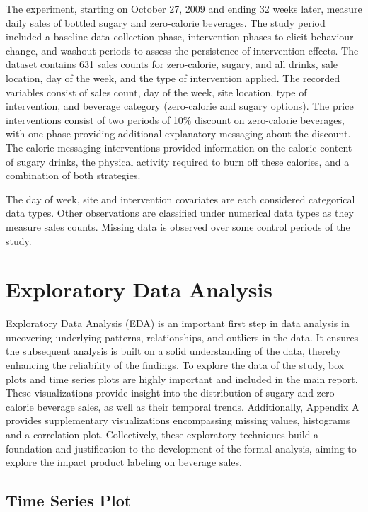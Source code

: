 \documentclass[
]{article}
\begin{document}
The experiment, starting on October 27, 2009 and ending 32 weeks later, measure daily sales of bottled sugary and zero-calorie beverages. The study period included a baseline data collection phase, intervention phases to elicit behaviour change, and washout periods to assess the persistence of intervention effects. The dataset contains 631 sales counts for zero-calorie, sugary, and all drinks, sale location, day of the week, and the type of intervention applied. The recorded variables consist of sales count, day of the week, site location, type of intervention, and beverage category (zero-calorie and sugary options). The price interventions consist of two periods of 10\% discount on zero-calorie beverages, with one phase providing additional explanatory messaging about the discount. The calorie messaging interventions provided information on the caloric content of sugary drinks, the physical activity required to burn off these calories, and a combination of both strategies.

The day of week, site and intervention covariates are each considered categorical data types. Other observations are classified under numerical data types as they measure sales counts. Missing data is observed over some control periods of the study.

\hypertarget{exploratory-data-analysis}{%
\section{Exploratory Data Analysis}\label{exploratory-data-analysis}}

Exploratory Data Analysis (EDA) is an important first step in data analysis in uncovering underlying patterns, relationships, and outliers in the data. It ensures the subsequent analysis is built on a solid understanding of the data, thereby enhancing the reliability of the findings. To explore the data of the study, box plots and time series plots are highly important and included in the main report. These visualizations provide insight into the distribution of sugary and zero-calorie beverage sales, as well as their temporal trends. Additionally, Appendix A provides supplementary visualizations encompassing missing values, histograms and a correlation plot. Collectively, these exploratory techniques build a foundation and justification to the development of the formal analysis, aiming to explore the impact product labeling on beverage sales.

\hypertarget{time-series-plot}{%
\subsection{Time Series Plot}\label{time-series-plot}}
\end{document}
